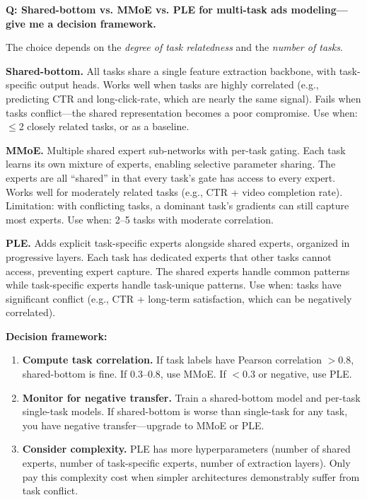 \begin{interviewq}
\textbf{Q: Shared-bottom vs. MMoE vs. PLE for multi-task ads modeling---give me a decision framework.}

 \quad {} \quad \badgefreq{\freqmed}

\stronganswer

The choice depends on the \textit{degree of task relatedness} and the \textit{number of tasks}.

\textbf{Shared-bottom.} All tasks share a single feature extraction backbone, with task-specific output heads. Works well when tasks are highly correlated (e.g., predicting CTR and long-click-rate, which are nearly the same signal). Fails when tasks conflict---the shared representation becomes a poor compromise. Use when: $\leq$2 closely related tasks, or as a baseline.

\textbf{MMoE.} Multiple shared expert sub-networks with per-task gating. Each task learns its own mixture of experts, enabling selective parameter sharing. The experts are all ``shared'' in that every task's gate has access to every expert. Works well for moderately related tasks (e.g., CTR + video completion rate). Limitation: with conflicting tasks, a dominant task's gradients can still capture most experts. Use when: 2--5 tasks with moderate correlation.

\textbf{PLE.} Adds explicit task-specific experts alongside shared experts, organized in progressive layers. Each task has dedicated experts that other tasks cannot access, preventing expert capture. The shared experts handle common patterns while task-specific experts handle task-unique patterns. Use when: tasks have significant conflict (e.g., CTR + long-term satisfaction, which can be negatively correlated).

\textbf{Decision framework:}
\begin{enumerate}
    \item \textbf{Compute task correlation.} If task labels have Pearson correlation $> 0.8$, shared-bottom is fine. If $0.3$--$0.8$, use MMoE. If $< 0.3$ or negative, use PLE.
    \item \textbf{Monitor for negative transfer.} Train a shared-bottom model and per-task single-task models. If shared-bottom is worse than single-task for any task, you have negative transfer---upgrade to MMoE or PLE.
    \item \textbf{Consider complexity.} PLE has more hyperparameters (number of shared experts, number of task-specific experts, number of extraction layers). Only pay this complexity cost when simpler architectures demonstrably suffer from task conflict.
\end{enumerate}


\end{interviewq}
